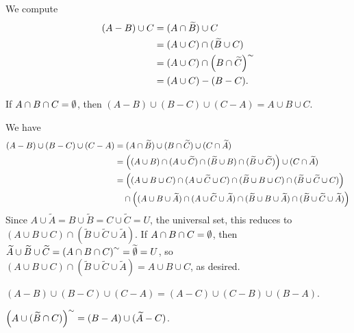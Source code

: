 \documentclass{report}
\newcommand*{\comp}[1]{\widetilde{#1}}
\begin{document}
\begin{solution}
We compute
\[
\begin{aligned}
    (A - B)\cup C &= (A\cap \widetilde{B})\cup C \\
    &= (A\cup C)\cap(\widetilde{B}\cup C) \\
    &= (A\cup C)\cap\prn{B\cap \widetilde{C}}^{\sim} \\
    &= (A\cup C)-\prn{B - C}.
\end{aligned}
\]
\end{solution}

\begin{exercise}
If $A\cap B\cap C = \emptyset$, then $(A-B)\cup(B-C)\cup(C-A)=A\cup B\cup C$.
\end{exercise}

\begin{solution}
We have
\[
\begin{aligned}
    (A-B)\cup(B-C)\cup(C-A) &= (A\cap \comp{B})\cup(B\cap \comp{C})\cup(C\cap\comp{A})\\
    &= \prn{(A\cup B) \cap (A\cup\comp C)\cap (\comp B \cup B)\cap (\comp B \cup \comp C)}\cup(C\cap\comp A)\\
    &= \prn{(A\cup B\cup C) \cap (A\cup\comp C\cup C)\cap (\comp B \cup B\cup C)\cap (\comp B \cup \comp C\cup C)}\\
    & \quad \cap\prn{(A\cup B\cup\comp A) \cap (A\cup\comp C\cup\comp A)\cap (\comp B \cup B\cup\comp A)\cap (\comp B \cup \comp C\cup\comp A)}\\
\end{aligned}
\]
Since $A\cup\comp A = B\cup\comp B =C\cup\comp C= U$, the universal set, this reduces to
$(A\cup B\cup C) \cap (\comp B \cup \comp C\cup\comp A)$.
If $A\cap B\cap C=\emptyset$,  then $\comp A\cup\comp B\cup\comp C = \prn{A\cap B\cap C}^{\sim}=\comp\eset=U$,
so $(A\cup B\cup C) \cap (\comp B \cup \comp C\cup\comp A) = A\cup B\cup C$, as desired.
\end{solution}

\begin{exercise}
$(A-B)\cup(B-C)\cup(C-A)=(A-C)\cup(C-B)\cup(B-A)$.
\end{exercise}

\begin{solution}

\end{solution}

\begin{exercise}
$\left(A\cup (\widetilde B\cap C)\right)^{\sim} = (B-A)\cup(\widetilde A-C)$.
\end{exercise}
\end{document}
